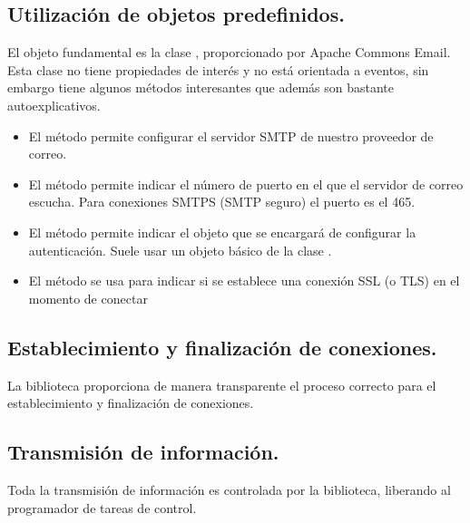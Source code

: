 \documentclass[letterpaper,10pt,spanish]{sphinxmanual}
\begin{document}
\subsection{Utilización de objetos predefinidos.}
\label{\detokenize{textos/tema4:utilizacion-de-objetos-predefinidos}}
El objeto fundamental es la clase , proporcionado por Apache Commons Email. Esta clase no tiene propiedades de interés y no está orientada a eventos, sin embargo tiene algunos métodos interesantes que además son bastante autoexplicativos.
\begin{itemize}
\item {} 
El método  permite configurar el servidor SMTP de nuestro proveedor de correo.

\item {} 
El método  permite indicar el número de puerto en el que el servidor de correo escucha. Para conexiones SMTPS (SMTP seguro) el puerto es el 465.

\item {} 
El método  permite indicar el objeto que se encargará de configurar la autenticación. Suele usar un objeto básico de la clase .

\item {} 
El método  se usa para indicar si se establece una conexión SSL (o TLS) en el momento de conectar

\end{itemize}


\subsection{Establecimiento y finalización de conexiones.}
\label{\detokenize{textos/tema4:establecimiento-y-finalizacion-de-conexiones}}
La biblioteca proporciona de manera transparente el proceso correcto para el establecimiento y finalización de conexiones.


\subsection{Transmisión de información.}
\label{\detokenize{textos/tema4:transmision-de-informacion}}
Toda la transmisión de información es controlada por la biblioteca, liberando al programador de tareas de control.
\end{document}

